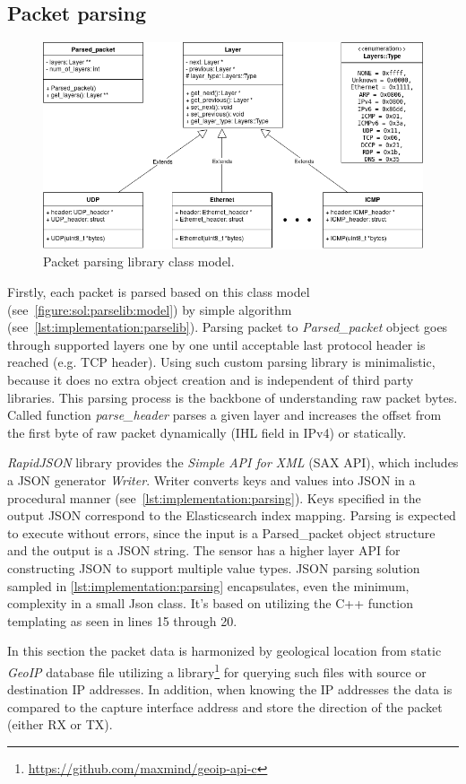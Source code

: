 \documentclass[12pt,a4paper,twoside]{report}
\begin{document}
		\subsection{Packet parsing} \label{implementation:sensor:parse}
			\begin{figure}[h]
				\centering
				\includegraphics[scale=0.5]{parsing}
				\caption{Packet parsing library class model.}
				\label{figure:sol:parselib:model}
			\end{figure}
			Firstly, each packet is parsed based on this class model (see~\autoref{figure:sol:parselib:model}) by simple algorithm (see~\autoref{lst:implementation:parselib}). Parsing packet to \emph{Parsed\_packet} object goes through supported layers one by one until acceptable last protocol header is reached (e.g. TCP header). Using such custom parsing library is minimalistic, because it does no extra object creation and is independent of third party libraries. This parsing process is the backbone of understanding raw packet bytes. Called function \emph{parse\_header} parses a given layer and increases the offset from the first byte of raw packet dynamically (IHL field in IPv4) or statically.
			
			
			\emph{RapidJSON} library provides the \emph{Simple API for XML} (SAX API), which includes a JSON generator \emph{Writer}. Writer converts keys and values into JSON in a procedural manner (see~\autoref{lst:implementation:parsing}). Keys specified in the output JSON correspond to the Elasticsearch index mapping. Parsing is expected to execute without errors, since the input is a Parsed\_packet object structure and the output is a JSON string. The sensor has a higher layer API for constructing JSON to support multiple value types. JSON parsing solution sampled in \autoref{lst:implementation:parsing} encapsulates, even the minimum, complexity in a small Json class. It's based on utilizing the C++ function templating as seen in lines 15 through 20.
			
			In this section the packet data is harmonized by geological location from static \emph{GeoIP} database file utilizing a library\footnote{\url{https://github.com/maxmind/geoip-api-c}} for querying such files with source or destination IP addresses. In addition, when knowing the IP addresses the data is compared to the capture interface address and store the direction of the packet (either RX or TX).
\end{document}
